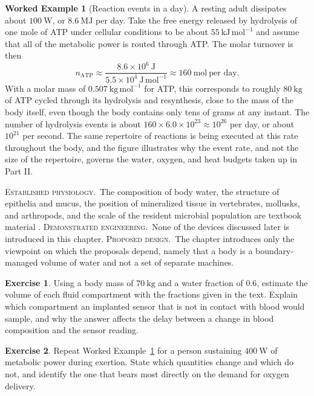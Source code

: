 \documentclass[11pt,openany]{book}
\theoremstyle{definition}
\newtheorem{example}{Worked Example}[chapter]
\newtheorem{exercise}{Exercise}[chapter]
\theoremstyle{remark}
\newcommand{\est}{\textsc{Established physiology.}\ }
\newcommand{\dem}{\textsc{Demonstrated engineering.}\ }
\newcommand{\pro}{\textsc{Proposed design.}\ }
\begin{document}
\begin{example}[Reaction events in a day]
\label{ex:atp}
A resting adult dissipates about $100\ \mathrm{W}$, or $8.6\ \mathrm{MJ}$ per day. Take the free energy released by hydrolysis of one mole of ATP under cellular conditions to be about $55\ \mathrm{kJ\,mol^{-1}}$ and assume that all of the metabolic power is routed through ATP. The molar turnover is then
\[
n_{\mathrm{ATP}}\approx\frac{8.6\times10^{6}\ \mathrm{J}}{5.5\times10^{4}\ \mathrm{J\,mol^{-1}}}\approx 160\ \mathrm{mol}\ \text{per day}.
\]
With a molar mass of $0.507\ \mathrm{kg\,mol^{-1}}$ for ATP, this corresponds to roughly $80\ \mathrm{kg}$ of ATP cycled through its hydrolysis and resynthesis, close to the mass of the body itself, even though the body contains only tens of grams at any instant. The number of hydrolysis events is about $160\times6.0\times10^{23}\approx10^{26}$ per day, or about $10^{21}$ per second. The same repertoire of reactions is being executed at this rate throughout the body, and the figure illustrates why the event rate, and not the size of the repertoire, governs the water, oxygen, and heat budgets taken up in Part II.
\end{example}

\begin{evidence}
\est The composition of body water, the structure of epithelia and mucus, the position of mineralized tissue in vertebrates, mollusks, and arthropods, and the scale of the resident microbial population are textbook material \cite{boron2017,guyton2021}. \dem None of the devices discussed later is introduced in this chapter. \pro The chapter introduces only the viewpoint on which the proposals depend, namely that a body is a boundary-managed volume of water and not a set of separate machines.
\end{evidence}

\begin{exercise}
Using a body mass of $70\ \mathrm{kg}$ and a water fraction of $0.6$, estimate the volume of each fluid compartment with the fractions given in the text. Explain which compartment an implanted sensor that is not in contact with blood would sample, and why the answer affects the delay between a change in blood composition and the sensor reading.
\end{exercise}

\begin{exercise}
Repeat Worked Example~\ref{ex:atp} for a person sustaining $400\ \mathrm{W}$ of metabolic power during exertion. State which quantities change and which do not, and identify the one that bears most directly on the demand for oxygen delivery.
\end{exercise}
\end{document}
